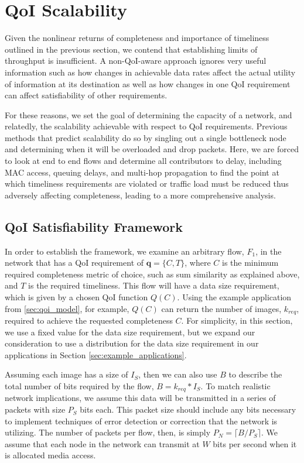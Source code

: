 \section{QoI Scalability}
\label{sec:qoi_scalability}

Given the nonlinear returns of completeness and importance of timeliness outlined in the previous section, we contend that establishing limits of throughput is insufficient.  A non-QoI-aware approach ignores very useful information such as how changes in achievable data rates affect the actual utility of information at its destination as well as how changes in one QoI requirement can affect satisfiability of other requirements.  

For these reasons, we set the goal of determining the capacity of a network, and relatedly, the scalability achievable with respect to QoI requirements.  Previous methods that predict scalability do so by singling out a single bottleneck node and determining when it will be overloaded and drop packets. Here, we are forced to look at end to end flows and determine all contributors to delay, including MAC access, queuing delays, and multi-hop propagation to find the point at which timeliness requirements are violated or traffic load must be reduced thus adversely affecting completeness, leading to a more comprehensive analysis.

\subsection{QoI Satisfiability Framework}
In order to establish the framework, we examine an arbitrary flow, $F_1$, in the network that has a QoI requirement of $\mathbf{q} = \{C, T\}$, where $C$ is the minimum required completeness metric of choice, such as sum similarity as explained above, and $T$ is the required timeliness.  This flow will have a data size requirement, which is given by a chosen QoI function $Q(C)$.  Using the example application from \ref{sec:qoi_model}, for example, $Q(C)$ can return the number of images, $k_{req}$, required to achieve the requested completeness $C$. For simplicity, in this section, we use a fixed value for the data size requirement, but we expand our consideration to use a distribution for the data size requirement in our applications in Section \ref{sec:example_applications}.

Assuming each image has a size of $I_S$, then we can also use $B$ to describe the total number of bits required by the flow, $B=k_{req}*I_S$.  To match realistic network implications, we assume this data will be transmitted in a series of packets with size $P_S$ bits each. This packet size should include any bits necessary to implement techniques of error detection or correction that the network is utilizing. The number of packets per flow, then, is simply $P_N = \lceil B/P_S \rceil$.  We assume that each node in the network can transmit at $W$ bits per second when it is allocated media access.

